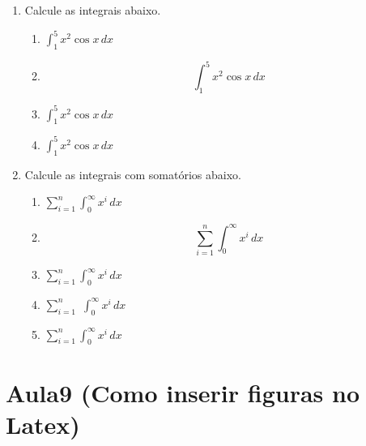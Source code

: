 \documentclass[a4paper,12pt]{article}
\newcommand{\integral}{\displaystyle\int}
\newcommand{\somatorio}{\displaystyle\sum}
\begin{document}
\begin{enumerate}
\begin{enumerate}
      \end{enumerate}
      \item Calcule as integrais abaixo.
      \begin{enumerate}
         \item $\int_1^5 x^2\cos x \, dx$
         \item $$\int_1^5 x^2\cos x \, dx$$
         \item $\displaystyle\int_1^5 x^2\cos x \, dx$
         \item $\integral_1^5 x^2\cos x \, dx$
      \end{enumerate}
      \item Calcule as integrais com somatórios abaixo.
      \begin{enumerate}
         \item $\sum_{i=1}^n \integral_0^{\infty} x^i\,dx$
         \item $$\sum_{i=1}^n \integral_0^{\infty} x^i\,dx$$
         \item $\displaystyle\sum_{i=1}^n \int_0^{\infty} x^i\,dx$
         \item $\displaystyle\sum_{i=1}^n $ $\int_0^{\infty} x^i\,dx$
         \item $\somatorio_{i=1}^n \integral_0^{\infty} x^i\,dx$
      \end{enumerate}
   \end{enumerate}
   
   \section{Aula9 (Como inserir figuras no Latex)}
   
\end{document}
